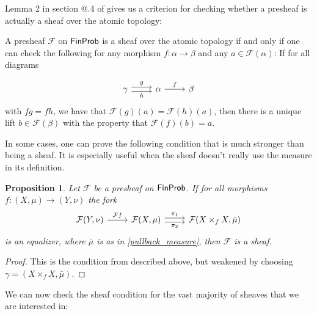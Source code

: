 \documentclass[a4paper]{amsproc}
\makeatletter
\theoremstyle{plain}
\newtheorem{proposition}[theorem]{Proposition}
\theoremstyle{definition}
\theoremstyle{remark}
\numberwithin{equation}{section}
\newcommand{\FinProb}{\textup{\textsf{FinProb}}}
\newcommand{\Rmnum}[1]{\expandafter\@slowromancap\romannumeral #1@}
\makeatother
\begin{document}
Lemma 2 in section \Rmnum{3}.4 of \cite{maclane2012sheaves} gives us a criterion for checking whether a presheaf is actually a sheaf over the atomic topology:

A presheaf $\mathcal{F}$ on $\FinProb$ is a sheaf over the atomic topology if and only if one can check the following for any morphism $f: \alpha \to \beta$ and any $a \in \mathcal{F}(\alpha)$: If for all diagrams

\[
\begin{tikzcd}
\gamma \arrow[r, "g", shift left] \arrow[r, "h"', shift right] & \alpha \arrow[r, "f"] & \beta
\end{tikzcd}
\]
with $f g = f h$, we have that $\mathcal{F}(g)(a) = \mathcal{F}(h)(a)$, then there is a unique lift $b \in \mathcal{F}(\beta)$ with the property that $\mathcal{F}(f)(b) = a$.

In some cases, one can prove the following condition that is much stronger than being a sheaf. It is especially useful when the sheaf doesn't really use the measure in its definition.

\begin{proposition} \label{sheaf_condition_weak}
Let $\mathcal{F}$ be a presheaf on $\FinProb$. If for all morphisms $f: (X,\mu) \to (Y,\nu)$ the fork
\[
\begin{tikzcd} \mathcal{F} (Y,\nu) \arrow[r, "\mathcal{F}f"] & \mathcal{F} (X,\mu) \arrow[r, "\pi_1", shift left] \arrow[r, "\pi_2"', shift right] & \mathcal{F} (X \times_f X,\bar{\mu})
\end{tikzcd}
\]
is an equalizer, where $\bar{\mu}$ is as in \ref{pullback_measure}, then $\mathcal{F}$ is a sheaf.
\end{proposition}
\begin{proof}
This is the condition from \cite{maclane2012sheaves} described above, but weakened by choosing $\gamma = (X \times_f X,\bar{\mu})$.
\end{proof}


We can now check the sheaf condition for the vast majority of sheaves that we are interested in:
\end{document}

